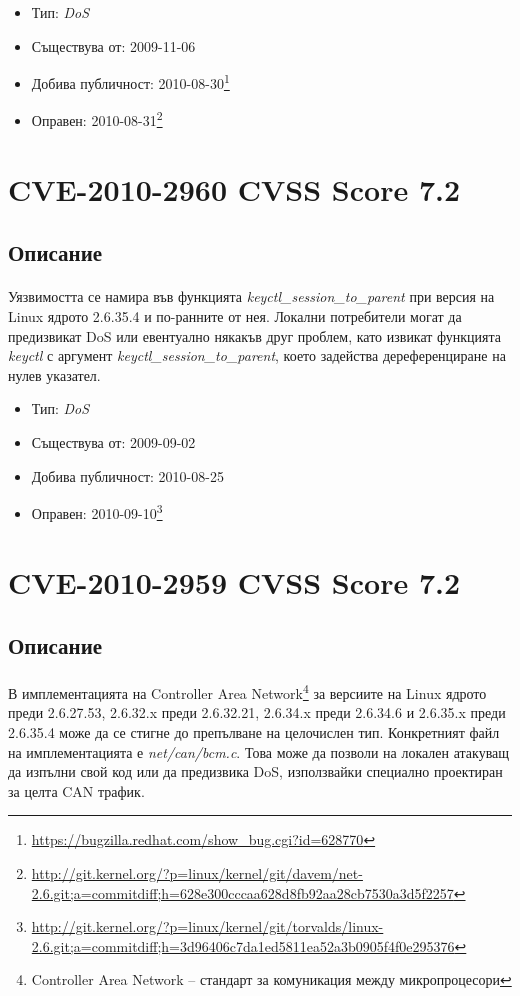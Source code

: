 \documentclass[a4paper,12pt,leqno]{article}
\begin{document}
\begin{itemize}
    \item Тип: \textit{DoS}
    \item Съществува от: 2009-11-06
  	\item Добива публичност: 2010-08-30\footnote{\url{https://bugzilla.redhat.com/show_bug.cgi?id=628770}}
    \item Оправен: 2010-08-31\footnote{\url{http://git.kernel.org/?p=linux/kernel/git/davem/net-2.6.git;a=commitdiff;h=628e300cccaa628d8fb92aa28cb7530a3d5f2257}}
\end{itemize}

\section{CVE-2010-2960 CVSS Score 7.2}
\subsection{Описание}
\paragraph{}
Уязвимостта се намира във функцията \textit{keyctl\_session\_to\_parent} при версия на 
Linux ядрото 2.6.35.4 и по-ранните от нея. Локални потребители могат да 
предизвикат DoS или евентуално някакъв друг проблем, като извикат 
функцията \textit{keyctl} с аргумент \textit{keyctl\_session\_to\_parent}, което задейства 
дереференциране на нулев указател.

\begin{itemize}
    \item Тип: \textit{DoS}
    \item Съществува от: 2009-09-02
  	\item Добива публичност: 2010-08-25
    \item Оправен: 2010-09-10\footnote{\url{http://git.kernel.org/?p=linux/kernel/git/torvalds/linux-2.6.git;a=commitdiff;h=3d96406c7da1ed5811ea52a3b0905f4f0e295376}}
\end{itemize}

\section{CVE-2010-2959 CVSS Score 7.2}
\subsection{Описание}
\paragraph{}
В имплементацията на Controller Area Network\footnote{Controller Area Network – стандарт за комуникация между микропроцесори}
 за версиите на Linux ядрото 
преди 2.6.27.53, 2.6.32.x преди 2.6.32.21, 2.6.34.x преди 2.6.34.6 и 2.6.35.x 
преди 2.6.35.4 може да се стигне до препълване на целочислен тип. 
Конкретният файл на имплементацията е \textit{net/can/bcm.c}. Това може да позволи 
на локален атакуващ да изпълни свой код или да предизвика DoS, 
използвайки специално проектиран за целта CAN трафик.
\end{document}
